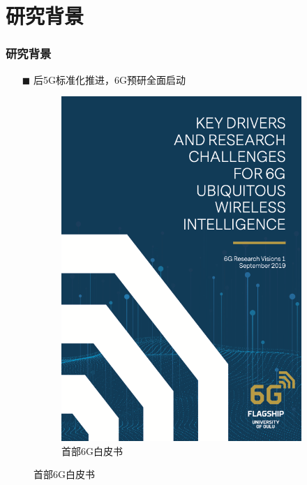 \documentclass[9pt,fontset=windows]{ctexbeamer}
\newcommand{\red}{\color{bitred}}
\begin{document}
	\section{研究背景}
	\begin{frame}[t]
		\frametitle{研究背景}
		\vspace{-3mm}
		\begin{itemize}
			\LARGE\heiti
			\item[$\blacksquare$] 后5G标准化推进，6G预研全面启动
		\end{itemize}
		\vspace{3mm}
		\begin{figure}[t]
			\centering
			\begin{subfigure}{0.3\textwidth}
				\centering
				\includegraphics[height=0.5\textheight]{assets/wp6gflagship.png}
				\caption*{\SourceHeiBold \red 首部{\SourceHeiBoldw 6G}白皮书\footnotemark}

\end{subfigure}
\end{figure}
\end{frame}
\end{document}
